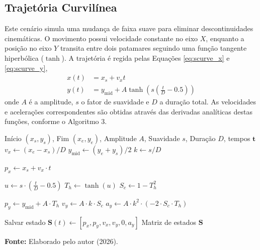 \documentclass[journal]{IEEEtran}
\begin{document}
\subsection{Trajetória Curvilínea}

Este cenário simula uma mudança de faixa suave para eliminar descontinuidades cinemáticas. O movimento possui velocidade constante no eixo $X$, enquanto a posição no eixo $Y$ transita entre dois patamares seguindo uma função tangente hiperbólica ($\tanh$). A trajetória é regida pelas Equações \eqref{eq:scurve_x} e \eqref{eq:scurve_y},
\begin{align}
    \label{eq:scurve_x}
    x(t) &= x_s + v_x t \\
    \label{eq:scurve_y}
    y(t) &= y_{\text{mid}} + A \tanh\left( s \left( \frac{t}{D} - 0.5 \right) \right)
\end{align}
onde $A$ é a amplitude, $s$ o fator de suavidade e $D$ a duração total. As velocidades e acelerações correspondentes são obtidas através das derivadas analíticas destas funções, conforme o Algoritmo 3.

\begin{algorithm}[H]
\caption{Trajetória de Troca de Faixa (S-Curve)}
\begin{algorithmic}[1]
\Require Início $(x_s, y_s)$, Fim $(x_e, y_e)$, Amplitude $A$, Suavidade $s$, Duração $D$, tempos $\mathbf{t}$
\State $v_x \gets (x_e - x_s) / D$ 
\State $y_{\text{mid}} \gets (y_e + y_s) / 2$
\State $k \gets s / D$ 

    \State {}
    \State $p_x \gets x_s + v_x \cdot t$
    
    \State {}
    \State $u \gets s \cdot (\frac{t}{D} - 0.5)$ 
    \State $T_h \gets \tanh(u)$
    \State $S_c \gets 1 - T_h^2$ 
    
    \State $p_y \gets y_{\text{mid}} + A \cdot T_h$
    \State $v_y \gets A \cdot k \cdot S_c$
    \State $a_y \gets A \cdot k^2 \cdot (-2 \cdot S_c \cdot T_h)$
    
    \State Salvar estado $\mathbf{S}(t) \gets [p_x, p_y, v_x, v_y, 0, a_y]$
\EndFor
\State \Return Matriz de estados $\mathbf{S}$
\end{algorithmic}
\vspace{4pt}
    \centerline{\footnotesize \textbf{Fonte:} Elaborado pelo autor (2026).}
\end{algorithm}
\end{document}
